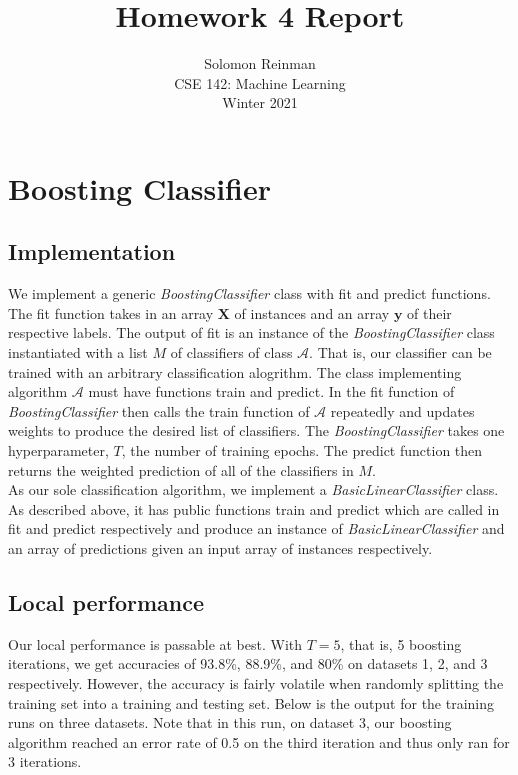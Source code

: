 \documentclass[12pt]{article}
\title{Homework 4 Report}
\author{Solomon Reinman \\
CSE 142: Machine Learning \\
Winter 2021}
\begin{document}
\maketitle

\section{Boosting Classifier}

\subsection{Implementation}

We implement a generic \textit{BoostingClassifier} class with fit and predict functions. The fit function takes in an array $\boldsymbol{X}$ of instances and an array $\boldsymbol{y}$ of their respective labels. The output of fit is an instance of the \textit{BoostingClassifier} class instantiated with a list $M$ of classifiers of class $\mathcal{A}$. That is, our classifier can be trained with an arbitrary classification alogrithm. The class implementing algorithm $\mathcal{A}$ must have functions train and predict. In the fit function of \textit{BoostingClassifier} then calls the train function of $\mathcal{A}$ repeatedly and updates weights to produce the desired list of classifiers. The \textit{BoostingClassifier} takes one hyperparameter, $T$, the number of training epochs. The predict function then returns the weighted prediction of all of the classifiers in $M$. \\
As our sole classification algorithm, we implement a \textit{BasicLinearClassifier} class. As described above, it has public functions train and predict which are called in fit and predict respectively and produce an instance of \textit{BasicLinearClassifier} and an array of predictions given an input array of instances respectively. 

\subsection{Local performance}

Our local performance is passable at best. With $T = 5$, that is, 5 boosting iterations, we get accuracies of 93.8\%, 88.9\%, and 80\% on datasets 1, 2, and 3 respectively. However, the accuracy is fairly volatile when randomly splitting the training set into a training and testing set. Below is the output for the training runs on three datasets. Note that in this run, on dataset 3, our boosting algorithm reached an error rate of 0.5 on the third iteration and thus only ran for 3 iterations.
\end{document}
